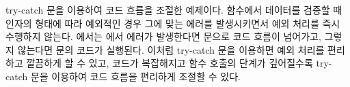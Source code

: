 \은 try-catch 문을 이용하여 코드 흐름을 조절한 예제이다.  함수에서 데이터를 검증할 때 인자의 형태에 따라 예외적인 경우 그에 맞는 에러를 발생시키면서 예외 처리를 즉시 수행하지 않는다. 에서는 에서 에러가 발생한다면  문으로 코드 흐름이 넘어가고, 그렇지 않는다면  문의 코드가 실행된다. 이처럼 try-catch 문을 이용하면 예외 처리를 편리하고 깔끔하게 할 수 있고, 코드가 복잡해지고 함수 호출의 단계가 깊어질수록 try-catch 문을 이용하여 코드 흐름을 편리하게 조절할 수 있다.
